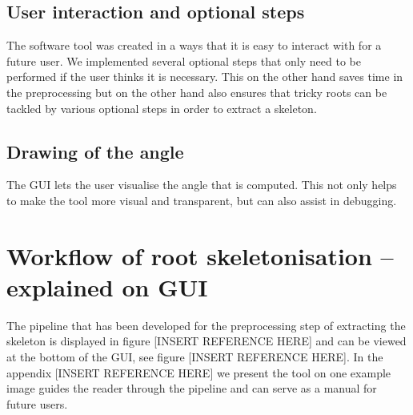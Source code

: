 \subsection{User interaction and optional steps}
The software tool was created in a ways that it is easy to interact with for a future user. 
We implemented several optional steps that only need to be performed if the user thinks it is necessary. This on the other hand saves time in the preprocessing but on the other hand also ensures that tricky roots can be tackled by various optional steps in order to extract a skeleton. 

\subsection{Drawing of the angle}
The GUI lets the user visualise the angle that is computed. This not only helps to make the tool more visual and transparent, but can also assist in debugging. 


\section{Workflow of root skeletonisation -- explained on GUI}

The pipeline that has been developed for the preprocessing step of extracting the skeleton is displayed in figure [INSERT REFERENCE HERE] and can be viewed at the bottom of the GUI, see figure [INSERT REFERENCE HERE].
In the appendix [INSERT REFERENCE HERE] we present the tool on one example image guides the reader through the pipeline and can serve as a manual for future users.


